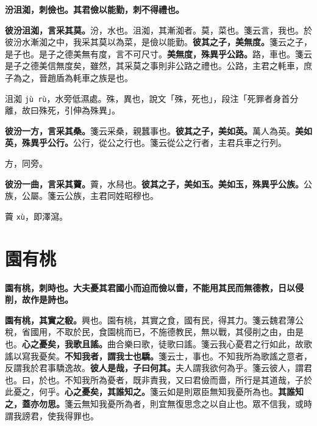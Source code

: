\textbf{汾沮洳，刺儉也。其君儉以能勤，刺不得禮也。}

\textbf{彼汾沮洳，言采其莫。}{\footnotesize 汾，水也。沮洳，其漸洳者。莫，菜也。箋云言，我也。於彼汾水漸洳之中，我采其莫以為菜，是儉以能勤。}\textbf{彼其之子，美無度。}{\footnotesize 箋云之子，是子也。是子之德美無有度，言不可尺寸。}\textbf{美無度，殊異乎公路。}{\footnotesize 路，車也。箋云是子之德美信無度矣，雖然，其采莫之事則非公路之禮也。公路，主君之軞車，庶子為之，晉趙盾為軞車之族是也。}

\begin{quoting}沮洳 \texttt{jù rù}，水旁低濕處。殊，異也，說文「殊，死也」，段注「死罪者身首分離，故曰殊死，引伸為殊異」。\end{quoting}

\textbf{彼汾一方，言采其桑。}{\footnotesize 箋云采桑，親蠶事也。}\textbf{彼其之子，美如英。}{\footnotesize 萬人為英。}\textbf{美如英，殊異乎公行。}{\footnotesize 公行，從公之行也。箋云從公之行者，主君兵車之行列。}

\begin{quoting}方，同旁。\end{quoting}

\textbf{彼汾一曲，言采其藚。}{\footnotesize 藚，水舄也。}\textbf{彼其之子，美如玉。美如玉，殊異乎公族。}{\footnotesize 公族，公屬。箋云公族，主君同姓昭穆也。}

\begin{quoting}藚 \texttt{xù}，即澤瀉。\end{quoting}

\section{園有桃}


\textbf{園有桃，刺時也。大夫憂其君國小而迫而儉以嗇，不能用其民而無德教，日以侵削，故作是詩也。}

\textbf{園有桃，其實之殽。}{\footnotesize 興也。園有桃，其實之食，國有民，得其力。箋云魏君薄公稅，省國用，不取於民，食園桃而已，不施德教民，無以戰，其侵削之由，由是也。}\textbf{心之憂矣，我歌且謠。}{\footnotesize 曲合樂曰歌，徒歌曰謠。箋云我心憂君之行如此，故歌謠以寫我憂矣。}\textbf{不知我者，謂我士也驕。}{\footnotesize 箋云士，事也。不知我所為歌謠之意者，反謂我於君事驕逸故。}\textbf{彼人是哉，子曰何其。}{\footnotesize 夫人謂我欲何為乎。箋云彼人，謂君也。曰，於也。不知我所為憂者，既非責我，又曰君儉而嗇，所行是其道哉，子於此憂之，何乎。}\textbf{心之憂矣，其誰知之。}{\footnotesize 箋云如是則眾臣無知我憂所為也。}\textbf{其誰知之，蓋亦勿思。}{\footnotesize 箋云無知我憂所為者，則宜無復思念之以自止也。眾不信我，或時謂我謗君，使我得罪也。}

